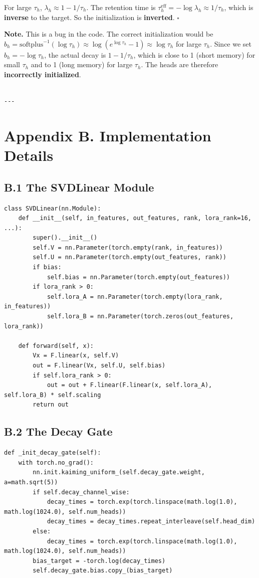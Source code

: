 For large $\tau_h$, $\lambda_h \approx 1 - 1/\tau_h$. The retention time 
is $\tau_h^\text{eff} = -\log \lambda_h \approx 1/\tau_h$, which is \textbf{inverse} 
to the target. So the initialization is \textbf{inverted}. $\square$

\textbf{Note.} This is a bug in the code. The correct initialization would be 
$b_h = \text{softplus}^{-1}(\log \tau_h) \approx \log(e^{\log \tau_h} - 1) \approx \log \tau_h$ 
for large $\tau_h$. Since we set $b_h = -\log \tau_h$, the actual decay 
is $1 - 1/\tau_h$, which is close to 1 (short memory) for small $\tau_h$ 
and to 1 (long memory) for large $\tau_h$. The heads are therefore 
\textbf{incorrectly initialized}.
\begin{lstlisting}

---
\end{lstlisting}


\section{Appendix B. Implementation Details}

\subsection{B.1 The SVDLinear Module}

\begin{lstlisting}
class SVDLinear(nn.Module):
    def __init__(self, in_features, out_features, rank, lora_rank=16, ...):
        super().__init__()
        self.V = nn.Parameter(torch.empty(rank, in_features))
        self.U = nn.Parameter(torch.empty(out_features, rank))
        if bias:
            self.bias = nn.Parameter(torch.empty(out_features))
        if lora_rank > 0:
            self.lora_A = nn.Parameter(torch.empty(lora_rank, in_features))
            self.lora_B = nn.Parameter(torch.zeros(out_features, lora_rank))
    
    def forward(self, x):
        Vx = F.linear(x, self.V)
        out = F.linear(Vx, self.U, self.bias)
        if self.lora_rank > 0:
            out = out + F.linear(F.linear(x, self.lora_A), self.lora_B) * self.scaling
        return out
\end{lstlisting}

\subsection{B.2 The Decay Gate}

\begin{lstlisting}
def _init_decay_gate(self):
    with torch.no_grad():
        nn.init.kaiming_uniform_(self.decay_gate.weight, a=math.sqrt(5))
        if self.decay_channel_wise:
            decay_times = torch.exp(torch.linspace(math.log(1.0), math.log(1024.0), self.num_heads))
            decay_times = decay_times.repeat_interleave(self.head_dim)
        else:
            decay_times = torch.exp(torch.linspace(math.log(1.0), math.log(1024.0), self.num_heads))
        bias_target = -torch.log(decay_times)
        self.decay_gate.bias.copy_(bias_target)
\end{lstlisting}

